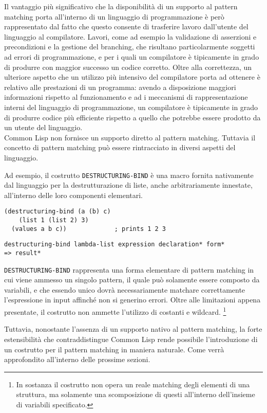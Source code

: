 Il vantaggio più significativo che la disponibilità di un supporto al pattern
matching porta all’interno di un linguaggio di programmazione è però
rappresentato dal fatto che questo consente di trasferire lavoro dall’utente
del linguaggio al compilatore. Lavori, come ad esempio la validazione di
asserzioni e precondizioni e la gestione del branching, che risultano
particolarmente soggetti ad errori di programmazione, e per i quali un
compilatore è tipicamente in grado di produrre con maggior successo un codice
corretto. Oltre alla correttezza, un ulteriore aspetto che un utilizzo più
intensivo del compilatore porta ad ottenere è relativo alle prestazioni di un
programma: avendo a disposizione maggiori informazioni rispetto al
funzionamento e ad i meccanismi di rappresentazione interni del linguaggio di
programmazione, un compilatore è tipicamente in grado di produrre codice più
efficiente rispetto a quello che potrebbe essere prodotto da un utente del
linguaggio.\\

Common Lisp non fornisce un supporto diretto al pattern matching.
Tuttavia il concetto di pattern matching può essere rintracciato in diversi
aspetti del linguaggio.

Ad esempio, il costrutto \texttt{DESTRUCTURING-BIND} è una macro fornita
nativamente dal linguaggio per la destrutturazione di liste, anche
arbitrariamente innestate, all’interno delle loro componenti elementari.

\begin{lstlisting}[caption=Esempio utilizzo della macro 
  \texttt{DESTRUCTURING-BIND}.]
(destructuring-bind (a (b) c)
    (list 1 (list 2) 3)
  (values a b c))             ; prints 1 2 3
\end{lstlisting}

\begin{lstlisting}[caption=Signature della macro \texttt{DESTRUCTURING-BIND}.]
destructuring-bind lambda-list expression declaration* form*
=> result*
\end{lstlisting}

\texttt{DESTRUCTURING-BIND} rappresenta una forma elementare di pattern
matching in cui viene ammesso un singolo pattern, il quale può
solamente essere composto da variabili, e che essendo unico dovrà
necessariamente matchare correttamente l’espressione in input affinché non si
generino errori. Oltre alle limitazioni appena presentate, il costrutto non
ammette l'utilizzo di costanti e wildcard. \footnote{In sostanza il costrutto
non opera un reale matching degli elementi di una struttura, ma solamente una
scomposizione di questi all'interno dell'insieme di variabili specificato.}

Tuttavia, nonostante l'assenza di un supporto nativo al pattern matching, la
forte estensibilità che contraddistingue Common Lisp rende possibile
l'introduzione di un costrutto per il pattern matching in maniera naturale.
Come verrà approfondito all'interno delle prossime sezioni.
